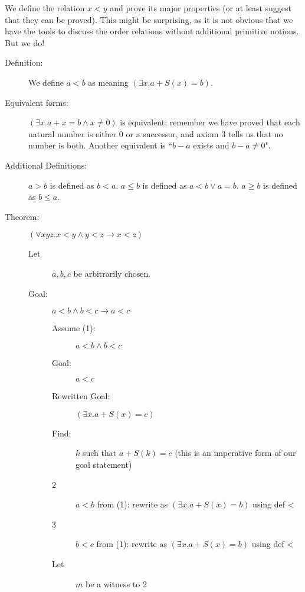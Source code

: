 \documentclass[12pt]{article}
\begin{document}
We define the relation $x<y$ and prove its major properties (or at least suggest that they can be proved).  This might be surprising,
as it is  not obvious that we have the tools to discuss the order relations without additional primitive notions.  But we do!

\begin{description}

\item[Definition:]  We define $a<b$ as meaning $(\exists x.a+S(x)=b)$.

\item[Equivalent forms:]  $(\exists x.a+x=b \wedge x \neq 0)$ is equivalent; remember we have proved that each natural
number is either 0 or a successor, and axiom 3 tells us that no number is both.  Another equivalent is ``$b-a$ exists and $b-a \neq 0$".

\item[Additional Definitions:]  $a>b$ is defined as $b<a$.  $a \leq b$ is defined as $a<b \vee a=b$.  $a \geq b$ is defined as $b \leq a$.

\item[Theorem:]  $(\forall xyz.x<y \wedge y <z \rightarrow x<z)$

\begin{description}

\item[Let]  $a,b,c$ be arbitrarily chosen.

\item[Goal:]  $a<b \wedge b<c \rightarrow a<c$

\begin{description}

\item[Assume (1):]  $a<b \wedge b<c$

\item[Goal:]  $a<c$

\item[Rewritten Goal:]  $(\exists x.a+S(x)=c)$

\item[Find:]  $k$ such that $a+S(k)=c$ (this is an imperative form of our goal statement)

\item[2]  $a<b$ from (1):  rewrite as $(\exists x.a+S(x)=b)$ using def <

\item[3]  $b<c$ from (1):  rewrite as $(\exists x.a+S(x)=b)$ using def <

\item[Let]  $m$ be a witness to 2


\end{description}
\end{description}
\end{description}
\end{document}
